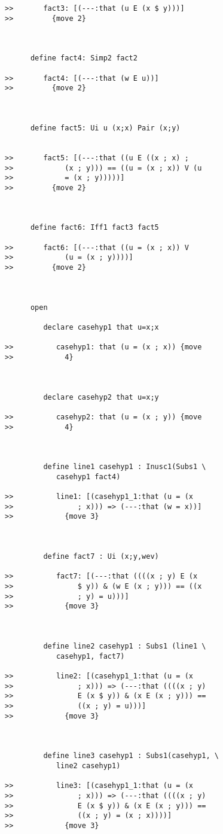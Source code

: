 \documentclass[12pt]{article}
\begin{document}
\begin{verbatim}
>>       fact3: [(---:that (u E (x $ y)))]
>>         {move 2}



      define fact4: Simp2 fact2

>>       fact4: [(---:that (w E u))]
>>         {move 2}



      define fact5: Ui u (x;x) Pair (x;y)


>>       fact5: [(---:that ((u E ((x ; x) ;
>>            (x ; y))) == ((u = (x ; x)) V (u
>>            = (x ; y)))))]
>>         {move 2}



      define fact6: Iff1 fact3 fact5

>>       fact6: [(---:that ((u = (x ; x)) V
>>            (u = (x ; y))))]
>>         {move 2}



      open

         declare casehyp1 that u=x;x

>>          casehyp1: that (u = (x ; x)) {move
>>            4}



         declare casehyp2 that u=x;y

>>          casehyp2: that (u = (x ; y)) {move
>>            4}



         define line1 casehyp1 : Inusc1(Subs1 \
            casehyp1 fact4)

>>          line1: [(casehyp1_1:that (u = (x
>>               ; x))) => (---:that (w = x))]
>>            {move 3}



         define fact7 : Ui (x;y,wev)

>>          fact7: [(---:that ((((x ; y) E (x
>>               $ y)) & (w E (x ; y))) == ((x
>>               ; y) = u)))]
>>            {move 3}



         define line2 casehyp1 : Subs1 (line1 \
            casehyp1, fact7)

>>          line2: [(casehyp1_1:that (u = (x
>>               ; x))) => (---:that ((((x ; y)
>>               E (x $ y)) & (x E (x ; y))) ==
>>               ((x ; y) = u)))]
>>            {move 3}



         define line3 casehyp1 : Subs1(casehyp1, \
            line2 casehyp1)

>>          line3: [(casehyp1_1:that (u = (x
>>               ; x))) => (---:that ((((x ; y)
>>               E (x $ y)) & (x E (x ; y))) ==
>>               ((x ; y) = (x ; x))))]
>>            {move 3}




\end{verbatim}
\end{document}
